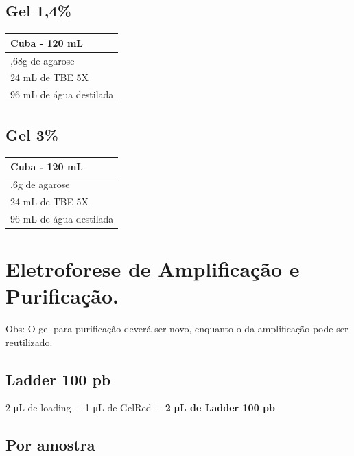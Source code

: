 \documentclass[
  letterpaper,
  DIV=11,
  numbers=noendperiod]{scrreprt}
\begin{document}
\hypertarget{gel-14}{%
\subsection{Gel 1,4\%}\label{gel-14}}

\begin{longtable}[]{@{}l@{}}
\toprule\noalign{}
Cuba - 120 mL \\
\midrule\noalign{}
\endhead
\bottomrule\noalign{}
\endlastfoot
1,68g de agarose \\
24 mL de TBE 5X \\
96 mL de água destilada \\
\end{longtable}

\hypertarget{gel-3}{%
\subsection{Gel 3\%}\label{gel-3}}

\begin{longtable}[]{@{}l@{}}
\toprule\noalign{}
Cuba - 120 mL \\
\midrule\noalign{}
\endhead
\bottomrule\noalign{}
\endlastfoot
3,6g de agarose \\
24 mL de TBE 5X \\
96 mL de água destilada \\
\end{longtable}

\hypertarget{eletroforese-de-amplificauxe7uxe3o-e-purificauxe7uxe3o.}{%
\section{Eletroforese de Amplificação e
Purificação.}\label{eletroforese-de-amplificauxe7uxe3o-e-purificauxe7uxe3o.}}

Obs: O gel para purificação deverá ser novo, enquanto o da amplificação
pode ser reutilizado.

\hypertarget{ladder-100-pb}{%
\subsection{Ladder 100 pb}\label{ladder-100-pb}}

2 μL de loading + 1 μL de GelRed + \textbf{2 μL de Ladder 100 pb}

\hypertarget{por-amostra}{%
\subsection{Por amostra}\label{por-amostra}}
\end{document}
